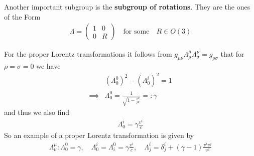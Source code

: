 Another important subgroup is the \textbf{subgroup of rotations}. They are the ones of the Form
\begin{align*}
  \Lambda = \begin{pmatrix}
  1 & 0\\
  0 & R
  \end{pmatrix}
  \quad \text{for some} \quad R \in O(3)
\end{align*}

For the proper Lorentz transformations it follows from $g_{\mu\nu}\Lambda_{\rho}^{\mu}\Lambda_{\sigma}^{\nu} = g_{\rho \sigma}$ that for $\rho = \sigma = 0$ we have
\begin{align*}
  &(\Lambda_{0}^{0})^{2} - (\Lambda_{0}^{i})^{2} = 1\\
  \implies &\Lambda_{0}^{0} = \frac{1}{\sqrt{1 - \frac{v^2}{c^2}}} =: \gamma
\end{align*}
and thus we also find
\begin{align*}
  \Lambda_{0}^{i} = \gamma \frac{v^{i}}{c}
\end{align*}
So an example of a proper Lorentz transformation is given by
\begin{align*}
  \Lambda_{\nu}^{\mu}: \Lambda_{0}^{0} = \gamma, \quad \Lambda_{0}^{i} = \Lambda_{i}^{0} = \gamma \frac{v^{i}}{c}, \quad \Lambda_{j}^{i} = \delta_{j}^{i} + (\gamma - 1) \frac{v^{i}v^{j}}{v^{2}}
\end{align*}


